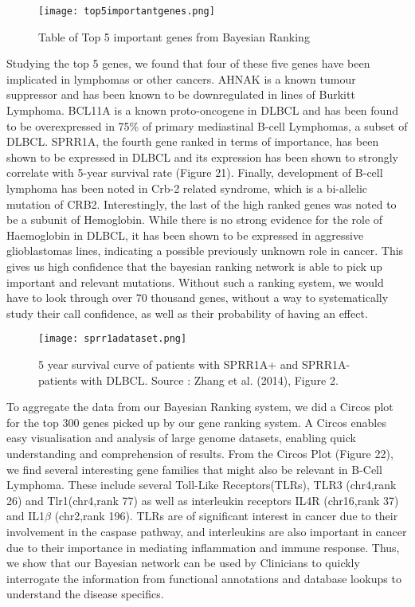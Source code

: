 \documentclass{article}
\begin{document}
\begin{figure}[H]
\caption{Table of Top 5 important genes from Bayesian Ranking}
\texttt{[image: top5importantgenes.png]}
\centering
\end{figure}

Studying the top 5 genes, we found that four of these five genes have been implicated in lymphomas or other cancers. AHNAK is a known tumour suppressor and has been known to be downregulated in lines of Burkitt Lymphoma. BCL11A is a known proto-oncogene in DLBCL and has been found to be overexpressed in 75\% of primary mediastinal B-cell Lymphomas, a subset of DLBCL. SPRR1A, the fourth gene ranked in terms of importance, has been shown to be expressed in DLBCL and its expression has been shown to strongly correlate with 5-year survival rate (Figure 21). Finally, development of B-cell lymphoma has been noted in Crb-2 related syndrome, which is a bi-allelic mutation of CRB2. Interestingly, the last of the high ranked genes was noted to be a subunit of Hemoglobin. While there is no strong evidence for the role of Haemoglobin in DLBCL, it has been shown to be expressed in aggressive glioblastomas lines, indicating a possible previously unknown role in cancer. This gives us high confidence that the bayesian ranking network is able to pick up important and relevant mutations. Without such a ranking system, we would have to look through over 70 thousand genes, without a way to systematically study their call confidence, as well as their probability of having an effect. 

\begin{figure}[H]
\centering
\texttt{[image: sprr1adataset.png]}
\caption{5 year survival curve of patients with SPRR1A+ and SPRR1A- patients with DLBCL. Source : Zhang et al. (2014), Figure 2.}
\end{figure}


To aggregate the data from our Bayesian Ranking system, we did a Circos plot for the top 300 genes picked up by our gene ranking system. A Circos enables easy visualisation and analysis of large genome datasets, enabling quick understanding and comprehension of results. From the Circos Plot (Figure 22), we find several interesting gene families that might also be relevant in B-Cell Lymphoma. These include several Toll-Like Receptors(TLRs), TLR3 (chr4,rank 26) and Tlr1(chr4,rank 77) as well as interleukin receptors IL4R (chr16,rank 37) and IL1$\beta$ (chr2,rank 196). TLRs are of significant interest in cancer due to their involvement in the caspase pathway, and interleukins are also important in cancer due to their importance in mediating inflammation and immune response. Thus, we show that our Bayesian network can be used by Clinicians to quickly interrogate the information from functional annotations and database lookups to understand the disease specifics. 
\end{document}
